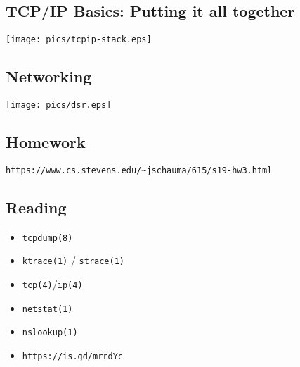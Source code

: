 \documentclass[xga]{xdvislides}
\begin{document}
\subsection{TCP/IP Basics: Putting it all together}
\vspace*{\fill}
\begin{center}
	\texttt{[image: pics/tcpip-stack.eps]}
\end{center}
\vspace*{\fill}

\subsection{Networking}
\vspace*{\fill}
\begin{center}
	\texttt{[image: pics/dsr.eps]} \\
\end{center}
\vspace*{\fill}

\subsection{Homework}

\verb+https://www.cs.stevens.edu/~jschauma/615/s19-hw3.html+

\subsection{Reading}
\begin{itemize}
	\item \verb+tcpdump(8)+
	\item \verb+ktrace(1)+ / \verb+strace(1)+
	\item \verb+tcp(4)+/\verb+ip(4)+
	\item \verb+netstat(1)+
	\item \verb+nslookup(1)+
\end{itemize}
\vspace{.5in}
\begin{itemize}
	\item \verb+https://is.gd/mrrdYc+
\end{itemize}
\end{document}
